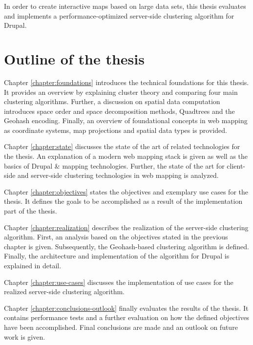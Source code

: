 In order to create interactive maps based on large data sets, this thesis evaluates and implements a performance-optimized server-side clustering algorithm for Drupal.


\section{Outline of the thesis}

Chapter \ref{chapter:foundations} introduces the technical foundations for this thesis. It provides an overview by explaining cluster theory and comparing four main clustering algorithms. Further, a discussion on spatial data computation introduces space order and space decomposition methods, Quadtrees and the Geohash encoding. Finally, an overview of foundational concepts in web mapping as coordinate systems, map projections and spatial data types is provided. 

Chapter \ref{chapter:state} discusses the state of the art of related technologies for the thesis. An explanation of a modern web mapping stack is given as well as the basics of Drupal \& mapping technologies. Further, the state of the art for client-side and server-side clustering technologies in web mapping is analyzed.

Chapter \ref{chapter:objectives} states the objectives and exemplary use cases for the thesis. It defines the goals to be accomplished as a result of the implementation part of the thesis.

Chapter \ref{chapter:realization} describes the realization of the server-side clustering algorithm. First, an analysis based on the objectives stated in the previous chapter is given. Subsequently, the Geohash-based clustering algorithm is defined. Finally, the architecture and implementation of the algorithm for Drupal is explained in detail.

Chapter \ref{chapter:use-cases} discusses the implementation of use cases for the realized server-side clustering algorithm.

Chapter \ref{chapter:conclusions-outlook} finally evaluates the results of the thesis. It contains performance tests and a further evaluation on how the defined objectives have been accomplished. Final conclusions are made and an outlook on future work is given.




